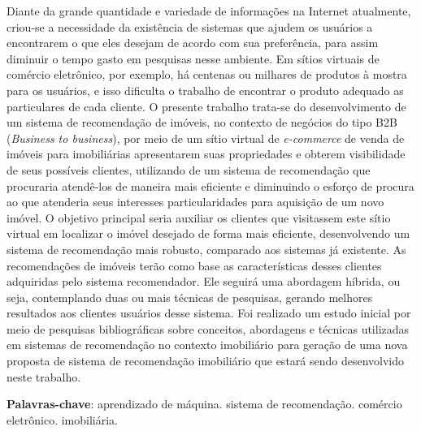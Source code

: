 \begin{resumo}

Diante da grande quantidade e variedade de informações na Internet atualmente, criou-se a necessidade da existência de sistemas que ajudem os usuários a encontrarem o que eles desejam de acordo com sua preferência, para assim diminuir o tempo gasto em pesquisas nesse ambiente. Em sítios virtuais de comércio eletrônico, por exemplo, há centenas ou milhares de produtos à mostra para os usuários, e isso dificulta o trabalho de encontrar o produto adequado as particulares de cada cliente. O presente trabalho trata-se do desenvolvimento de um sistema de recomendação de imóveis, no contexto de negócios do tipo B2B (\textit{Business to business}), por meio de um sítio virtual de \textit{e-commerce} de venda de imóveis para imobiliárias apresentarem suas propriedades e obterem visibilidade de seus possíveis clientes, utilizando de um sistema de recomendação que procuraria atendê-los de maneira mais eficiente e diminuindo o esforço de procura ao que atenderia seus interesses particularidades para aquisição de um novo imóvel. O objetivo principal seria auxiliar os clientes que visitassem este sítio virtual em localizar o imóvel desejado de forma mais eficiente, desenvolvendo um sistema de recomendação mais robusto, comparado aos sistemas já existente. As recomendações de imóveis terão como base as características desses clientes adquiridas pelo sistema recomendador. Ele seguirá uma abordagem híbrida, ou seja, contemplando duas ou mais técnicas de pesquisas, gerando melhores resultados aos clientes usuários desse sistema. Foi realizado um estudo inicial por meio de pesquisas bibliográficas sobre conceitos, abordagens e técnicas utilizadas em sistemas de recomendação no contexto imobiliário para geração de uma nova proposta de sistema de recomendação imobiliário que estará sendo desenvolvido neste trabalho.

 \vspace{\onelineskip}
    
 \noindent
 \textbf{Palavras-chave}: aprendizado de máquina. sistema de recomendação. comércio eletrônico. imobiliária.
\end{resumo}
